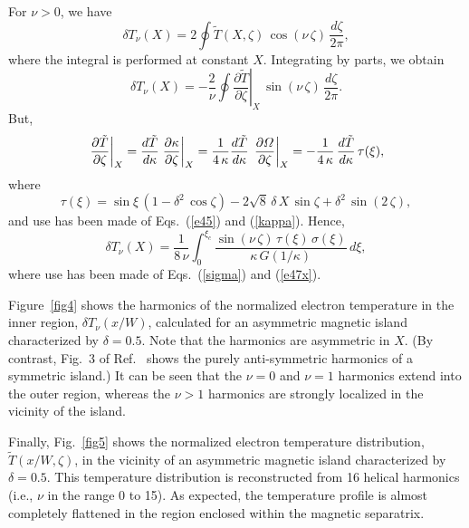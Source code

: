 \documentclass{iopjournal}
\begin{document}
For $\nu>0$, we have
\begin{equation}
\delta T_\nu(X) = 2\oint\tilde{T}(X,\zeta)\,\cos(\nu\,\zeta)\,\frac{d\zeta}{2\pi},
\end{equation}
where the integral is performed at constant $X$. 
Integrating by parts, we obtain
\begin{equation}
\delta T_\nu(X) = -\frac{2}{\nu}\oint\left.\frac{\partial \tilde{T}}{\partial\zeta}\right|_X\,\sin(\nu\,\zeta)\,\frac{d\zeta}{2\pi}.
\end{equation}
But,
\begin{equation}
\left.\frac{\partial \tilde{T}}{\partial\zeta}\right|_X=\frac{d\tilde{T}}{d\kappa}\left.\frac{\partial \kappa}{\partial\zeta}\right|_{X}
=\frac{1}{4\,\kappa}\frac{d\tilde{T}}{d\kappa}\,\left.\frac{\partial {\mit\Omega}}{\partial\zeta}\right|_{X}=-\frac{1}{4\,\kappa}\,\frac{d\tilde{T}}{d\kappa}\,\tau(\xi),
\end{equation}
where
\begin{equation}
\tau(\xi) = \sin\xi\,(1-\delta^2\,\cos\zeta)  -2\sqrt{8}\,\delta\,X\,\sin\zeta +\delta^2\,\sin(2\,\zeta),
\end{equation}
and use has been made of Eqs.~(\ref{e45}) and (\ref{kappa}). 
Hence,
\begin{equation}
\delta T_\nu(X) =\frac{1}{8\,\nu}\int_0^{\xi_c}\frac{\sin(\nu\,\zeta)\,\tau(\xi)\,\sigma(\xi)}{\kappa\,G(1/\kappa)}\,d\xi,
\end{equation}
where use has been made of Eqs.~(\ref{sigma}) and (\ref{e47x}).

Figure~\ref{fig4} shows the harmonics of the normalized electron temperature  in the inner region, $\delta T_\nu(x/W)$, calculated for an asymmetric
magnetic island characterized by $\delta=0.5$.  Note that the harmonics are asymmetric in $X$. 
(By contrast, Fig.~3 of Ref.~\cite{ntm2} 
shows
the purely anti-symmetric harmonics of a symmetric island.) It can be seen that the $\nu=0$ and $\nu=1$ harmonics extend into the outer region, whereas the
$\nu>1$ harmonics are strongly localized in the vicinity of the island. 

Finally, Fig.~\ref{fig5} shows the normalized electron temperature distribution, $\tilde{T}(x/W,\zeta)$, in the vicinity of an asymmetric magnetic island  characterized by
$\delta = 0.5$. This temperature distribution
is reconstructed from 16 helical harmonics (i.e., $\nu$ in the range 0 to 15). As expected, the temperature profile is almost completely flattened in the region enclosed  within the magnetic separatrix. 
\end{document}
